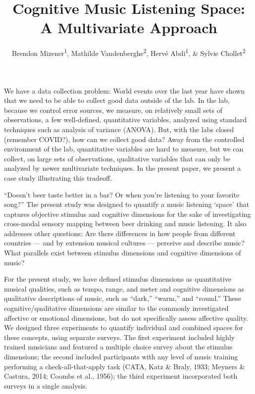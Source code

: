 \documentclass[
  english,
  man,floatsintext]{apa6}
\title{Cognitive Music Listening Space: A Multivariate Approach}
\author{Brendon Mizener\textsuperscript{1}, Mathilde Vandenberghe\textsuperscript{2}, Hervé Abdi\textsuperscript{1}, \& Sylvie Chollet\textsuperscript{2}}
\date{}
\affiliation{\vspace{0.5cm}\textsuperscript{1} University of Texas at Dallas\\\textsuperscript{2} Junia, Univ. Artois, Université de Liège, Univ. Littoral Côte d'Opale, UMRT 1158 BioEcoAgro, F-62000 Arras, France}
\begin{document}
\maketitle

We have a data collection problem: World events over the last year have shown that we need to be able to collect good data outside of the lab. In the lab, because we control error sources, we measure, on relatively small sets of observations, a few well-defined, quantitative variables, analyzed using standard techniques such as analysis of variance (ANOVA). But, with the labs closed (remember COVID?), how can we collect good data? Away from the controlled environment of the lab, quantitative variables are hard to measure, but we can collect, on large sets of observations, qualitative variables that can only be analyzed by newer multivariate techniques. In the present paper, we present a case study illustrating this tradeoff.

``Doesn't beer taste better in a bar? Or when you're listening to your favorite song?'' The present study was designed to quantify a music listening `space' that captures objective stimulus and cognitive dimensions for the sake of investigating cross-modal sensory mapping between beer drinking and music listening. It also addresses other questions: Are there differences in how people from different countries --- and by extension musical cultures --- perceive and describe music? What parallels exist between stimulus dimensions and cognitive dimensions of music?

For the present study, we have defined stimulus dimensions as quantitative musical qualities, such as tempo, range, and meter and cognitive dimensions as qualitative descriptions of music, such as ``dark,'' ``warm,'' and ``round.'' These cognitive/qualitative dimensions are similar to the commonly investigated affective or emotional dimensions, but do not specifically assess affective quality. We designed three experiments to quantify individual and combined spaces for these concepts, using separate surveys. The first experiment included highly trained musicians and featured a multiple choice survey about the stimulus dimensions; the second included participants with any level of music training performing a check-all-that-apply task (CATA, Katz \& Braly, 1933; Meyners \& Castura, 2014; Coombs et al., 1956); the third experiment incorporated both surveys in a single analysis.
\end{document}
